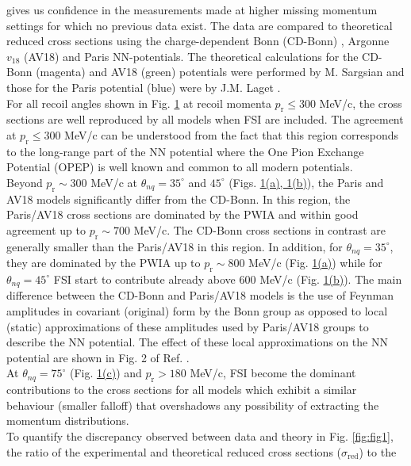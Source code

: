 gives us confidence in the measurements made at higher missing momentum settings for which no previous data exist.
The data are compared to theoretical reduced
cross sections using the charge-dependent Bonn (CD-Bonn) \cite{PhysRevC.63.024001}, Argonne $v_{18}$ (AV18) \cite{PhysRevC.51.38} and Paris \cite{PhysRevC.21.861} NN-potentials. The theoretical calculations
for the CD-Bonn (magenta) and AV18 (green) potentials were performed by M. Sargsian \cite{PhysRevC.82.014612} and those for the Paris potential  (blue) were  by J.M. Laget \cite{LAGET2005}.\\
\indent For all recoil angles shown in Fig. \hyperref[fig:fig1]{1} at recoil momenta $p_{\mathrm{r}}\leq300$ MeV/c, the cross sections are well reproduced  by  all models when FSI are included.
The agreement at $p_{\mathrm{r}}\leq300$ MeV/c can be understood from the fact that this region corresponds to the long-range part of the NN potential where the One Pion Exchange Potential (OPEP)
is well known and common to all modern potentials. \\
\indent Beyond $p_{\mathrm{r}}\sim300$ MeV/c at $\theta_{nq}=35^{\circ}$ and $45^{\circ}$ (Figs. \hyperref[fig:fig1]{1(a), 1(b)}), the Paris and
AV18 models significantly differ from the CD-Bonn. In this region, the Paris/AV18 cross sections are dominated by the PWIA and within good agreement up to $p_{\mathrm{r}}\sim700$ MeV/c. The CD-Bonn cross sections in contrast are generally smaller than the Paris/AV18 in this region.  In addition, for $\theta_{nq}=35^{\circ}$, they are dominated by the PWIA up to $p_{\mathrm{r}}\sim800$ MeV/c (Fig. \hyperref[fig:fig1]{1(a)})  while for $\theta_{nq}=45^{\circ}$  FSI start to contribute already above 600 MeV/c (Fig. \hyperref[fig:fig1]{1(b)}).
The main difference between the CD-Bonn and Paris/AV18 models is the use of Feynman amplitudes in covariant (original) form by the Bonn group as opposed to local (static) approximations of these amplitudes used by Paris/AV18 groups
to describe the NN potential. The effect of these local approximations on the NN potential are shown in Fig. 2 of Ref. \cite{PhysRevC.63.024001}. \\
\indent At $\theta_{nq}=75^{\circ}$ (Fig. \hyperref[fig:fig1]{1(c)}) and $p_{\mathrm{r}}>180$ MeV/c, FSI become the dominant contributions to the cross sections for all models which exhibit a similar
behaviour (smaller falloff) that overshadows any possibility of extracting the momentum distributions.\\
\indent To quantify the discrepancy observed between data and theory in Fig. \ref{fig:fig1}, the ratio of the experimental and theoretical reduced cross sections ($\sigma_{\mathrm{red}}$) to the
